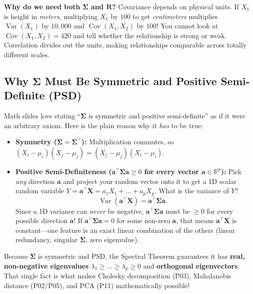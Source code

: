 \documentclass[11pt, a4paper]{article}
\begin{document}
\textbf{Why do we need both $\boldsymbol{\Sigma}$ and $\mathbf{R}$?} Covariance depends on physical units. If $X_1$ is height in \emph{meters}, multiplying $X_1$ by $100$ to get \emph{centimeters} multiplies $\operatorname{Var}(X_1)$ by $10{,}000$ and $\operatorname{Cov}(X_1, X_2)$ by $100$! You cannot look at $\operatorname{Cov}(X_1, X_2) = 420$ and tell whether the relationship is strong or weak. Correlation divides out the units, making relationships comparable across totally different scales.

\subsection{Why $\boldsymbol{\Sigma}$ Must Be Symmetric and Positive Semi-Definite (PSD)}
Math slides love stating ``$\boldsymbol{\Sigma}$ is symmetric and positive semi-definite'' as if it were an arbitrary axiom. Here is the plain reason why it \emph{has} to be true:
\begin{itemize}
    \item \textbf{Symmetry ($\boldsymbol{\Sigma} = \boldsymbol{\Sigma}^\top$):} Multiplication commutes, so $(X_i - \mu_i)(X_j - \mu_j) = (X_j - \mu_j)(X_i - \mu_i)$.
    \item \textbf{Positive Semi-Definiteness ($\mathbf{a}^\top \boldsymbol{\Sigma} \mathbf{a} \ge 0$ for every vector $\mathbf{a} \in \mathbb{R}^p$):} Pick \emph{any} direction $\mathbf{a}$ and project your random vector onto it to get a 1D scalar random variable $Y = \mathbf{a}^\top \mathbf{X} = a_1 X_1 + \dots + a_p X_p$. What is the variance of $Y$?
    \[
        \operatorname{Var}(\mathbf{a}^\top \mathbf{X}) = \mathbf{a}^\top \boldsymbol{\Sigma} \mathbf{a}.
    \]
    Since a 1D variance can \emph{never} be negative, $\mathbf{a}^\top \boldsymbol{\Sigma} \mathbf{a}$ must be $\ge 0$ for every possible direction $\mathbf{a}$! If $\mathbf{a}^\top \boldsymbol{\Sigma} \mathbf{a} = 0$ for some non-zero $\mathbf{a}$, that means $\mathbf{a}^\top \mathbf{X}$ is constant---one feature is an exact linear combination of the others (linear redundancy, singular $\boldsymbol{\Sigma}$, zero eigenvalue).
\end{itemize}
Because $\boldsymbol{\Sigma}$ is symmetric and PSD, the Spectral Theorem guarantees it has \textbf{real, non-negative eigenvalues} $\lambda_1 \ge \dots \ge \lambda_p \ge 0$ and \textbf{orthogonal eigenvectors}. That single fact is what makes Cholesky decomposition (P03), Mahalanobis distance (P02/P05), and PCA (P11) mathematically possible!
\end{document}
